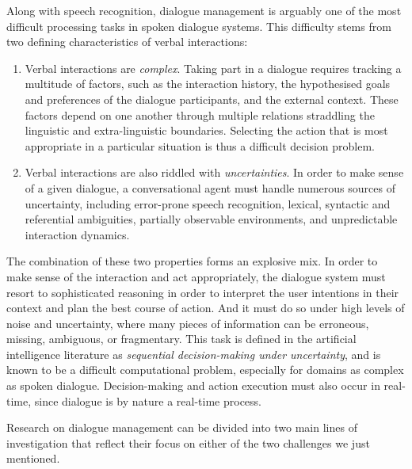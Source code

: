 Along with speech recognition, dialogue management is arguably one of the most difficult processing tasks in spoken dialogue systems. This difficulty stems from two defining characteristics of verbal interactions:
\begin{enumerate}
\item Verbal interactions are \textit{complex}.   Taking part in a dialogue requires tracking a multitude of factors, such as the interaction history, the hypothesised goals and preferences of the dialogue participants, and the external context. These factors depend on one another through multiple relations straddling the linguistic and extra-linguistic boundaries.  Selecting the action that is most appropriate in a particular situation is thus a difficult decision problem. 

\item Verbal interactions are also riddled with \textit{uncertainties}.  In order to make sense of a given dialogue, a conversational agent must handle numerous sources of uncertainty, including error-prone speech recognition, lexical,  syntactic and referential ambiguities, partially observable environments, and unpredictable interaction dynamics.  
\end{enumerate} 

The combination of these two properties forms an explosive mix.  In order to make sense of the interaction and act appropriately, the dialogue system must resort to sophisticated reasoning in order to interpret the user intentions in their context and plan the best course of action.  And it must do so under high levels of noise and uncertainty, where many pieces of information can be erroneous, missing, ambiguous, or fragmentary. This task is defined in the artificial intelligence literature as \textit{sequential decision-making under uncertainty}, and is known to be a difficult computational problem, especially for domains as complex as spoken dialogue. Decision-making and action execution must also occur in real-time, since dialogue is by nature a real-time process. 


Research on dialogue management can be divided into two main lines of investigation that reflect their focus on either of the two challenges we just mentioned.  

